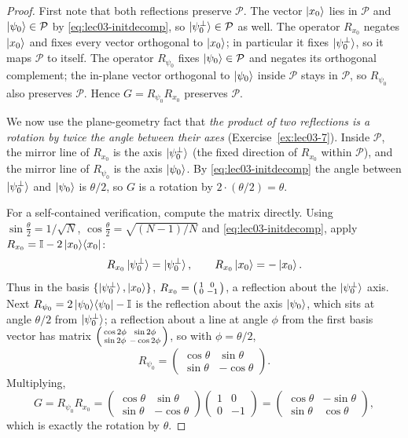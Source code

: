 \begin{proof}
First note that both reflections preserve $\mathcal{P}$. The vector $\ket{x_0}$
lies in $\mathcal{P}$ and $\ket{\psi_0}\in\mathcal{P}$ by
\eqref{eq:lec03-initdecomp}, so $\ket{\psi_0^{\perp}}\in\mathcal{P}$ as well. The
operator $R_{x_0}$ negates $\ket{x_0}$ and fixes every vector orthogonal to
$\ket{x_0}$; in particular it fixes $\ket{\psi_0^{\perp}}$, so it maps
$\mathcal{P}$ to itself. The operator $R_{\psi_0}$ fixes $\ket{\psi_0}\in\mathcal P$
and negates its orthogonal complement; the in-plane vector orthogonal to
$\ket{\psi_0}$ inside $\mathcal P$ stays in $\mathcal P$, so $R_{\psi_0}$ also
preserves $\mathcal{P}$. Hence $G=R_{\psi_0}R_{x_0}$ preserves $\mathcal{P}$.

We now use the plane-geometry fact that \emph{the product of two reflections is a
rotation by twice the angle between their axes} (Exercise~\ref{ex:lec03-7}).
Inside $\mathcal P$, the mirror line of $R_{x_0}$ is the axis
$\ket{\psi_0^{\perp}}$ (the fixed direction of $R_{x_0}$ within $\mathcal P$), and
the mirror line of $R_{\psi_0}$ is the axis $\ket{\psi_0}$. By
\eqref{eq:lec03-initdecomp} the angle between $\ket{\psi_0^{\perp}}$ and
$\ket{\psi_0}$ is $\theta/2$, so $G$ is a rotation by $2\cdot(\theta/2)=\theta$.

For a self-contained verification, compute the matrix directly. Using
$\sin\tfrac{\theta}{2}=1/\sqrt N$, $\cos\tfrac{\theta}{2}=\sqrt{(N-1)/N}$ and
\eqref{eq:lec03-initdecomp}, apply $R_{x_0}=\mathbb{I}-2\ket{x_0}\!\bra{x_0}$:
\[
  R_{x_0}\ket{\psi_0^{\perp}}=\ket{\psi_0^{\perp}},
  \qquad
  R_{x_0}\ket{x_0}=-\ket{x_0}.
\]
Thus in the basis $\{\ket{\psi_0^{\perp}},\ket{x_0}\}$,
$R_{x_0}=\begin{psmallmatrix}1&0\\0&-1\end{psmallmatrix}$, a reflection about the
$\ket{\psi_0^{\perp}}$ axis. Next $R_{\psi_0}=2\ket{\psi_0}\!\bra{\psi_0}-\mathbb{I}$ is the reflection
about the axis $\ket{\psi_0}$, which sits at angle $\theta/2$ from
$\ket{\psi_0^{\perp}}$; a reflection about a line at angle $\phi$ from the first
basis vector has matrix
$\begin{psmallmatrix}\cos2\phi&\sin2\phi\\\sin2\phi&-\cos2\phi\end{psmallmatrix}$,
so with $\phi=\theta/2$,
\[
  R_{\psi_0}=\begin{pmatrix}\cos\theta&\sin\theta\\ \sin\theta&-\cos\theta\end{pmatrix}.
\]
Multiplying,
\[
  G=R_{\psi_0}R_{x_0}
   =\begin{pmatrix}\cos\theta&\sin\theta\\ \sin\theta&-\cos\theta\end{pmatrix}
    \begin{pmatrix}1&0\\0&-1\end{pmatrix}
   =\begin{pmatrix}\cos\theta&-\sin\theta\\ \sin\theta&\cos\theta\end{pmatrix},
\]
which is exactly the rotation by $\theta$.
\end{proof}

